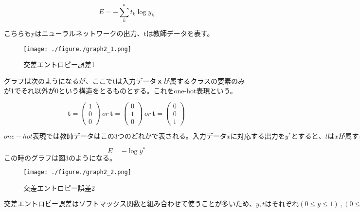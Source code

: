 \begin{equation}
\label{交差エントロピー誤差}
E = -\sum_k^n t_k \log y_k
\end{equation}

こちらもyはニューラルネットワークの出力、tは教師データを表す。

\begin{figure}[h]
\begin{center}
\texttt{[image: ./figure./graph2\_1.png]}
\end{center}
\caption{交差エントロピー誤差1}
\end{figure}

グラフは次のようになるが、ここでtは入力データｘが属するクラスの要素のみが1でそれ以外が0という構造をとるものとする。これをone-hot表現という。

\[
  \bm{t} = \left(
    \begin{array}{c}
      1 \\
      0 \\
      0
    \end{array}
	\right)\ or\ 
\bm{t} = \left(
    \begin{array}{c}
      0 \\
      1 \\
      0
    \end{array}
  \right)\ or\ 
\bm{t} = \left(
    \begin{array}{c}
      0 \\
      0 \\
      1
    \end{array}
  \right)
\]

$one-hot表現では教師データはこの3つのどれかで表される。入力データxに対応する出力をy^*とすると、tはxが属するクラスのみ1でそれ以外が0となるため、交差エントロピー誤差の式は次のように変形できる。$

\begin{equation}
\label{交差エントロピー誤差}
E = - \log y^*
\end{equation}
$この時のグラフは図3のようになる。$

\begin{figure}[h]
\begin{center}
\texttt{[image: ./figure./graph2\_2.png]}
\end{center}
\caption{交差エントロピー誤差2}
\end{figure}

$交差エントロピー誤差はソフトマックス関数と組み合わせて使うことが多いため、y,tはそれぞれ(0\le y \le 1)\ , (0\le t \le 1)となり、確率のように扱える。交差エントロピー誤差はyがtに近い値を出力するほど値が小さくなっていく。交差エントロピー誤差の最小値はy=1、つまりy=tになる時に最小値をとる。またy=0の時は損失関数の値が∞に発散してしまうので、実装する際にはyに微小な値を足し合わせることで発散を防ぐ。$
\begin{flushright}
\bunseki{※伊藤　晋之介}
\end{flushright}

